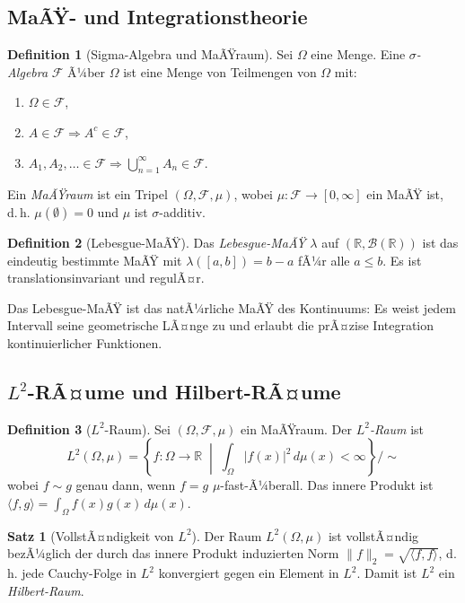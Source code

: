 ﻿\documentclass[a4paper,12pt]{article}
\theoremstyle{definition}
\newtheorem{definition}{Definition}
\newtheorem{satz}{Satz}
\begin{document}
\subsection{MaÃŸ- und Integrationstheorie}

\begin{definition}[Sigma-Algebra und MaÃŸraum]
Sei $\Omega$ eine Menge.  Eine \emph{$\sigma$-Algebra} $\mathcal{F}$ Ã¼ber $\Omega$ ist eine
Menge von Teilmengen von $\Omega$ mit:
\begin{enumerate}
    \item $\Omega \in \mathcal{F}$,
    \item $A \in \mathcal{F} \Rightarrow A^c \in \mathcal{F}$,
    \item $A_1, A_2, \ldots \in \mathcal{F} \Rightarrow \bigcup_{n=1}^\infty A_n \in \mathcal{F}$.
\end{enumerate}
Ein \emph{MaÃŸraum} ist ein Tripel $(\Omega, \mathcal{F}, \mu)$, wobei
$\mu: \mathcal{F} \to [0,\infty]$ ein MaÃŸ ist, d.\,h. $\mu(\emptyset)=0$ und
$\mu$ ist $\sigma$-additiv.
\end{definition}

\begin{definition}[Lebesgue-MaÃŸ]
Das \emph{Lebesgue-MaÃŸ} $\lambda$ auf $(\mathbb{R}, \mathcal{B}(\mathbb{R}))$ ist
das eindeutig bestimmte MaÃŸ mit $\lambda([a,b]) = b-a$ fÃ¼r alle $a \leq b$.
Es ist translationsinvariant und regulÃ¤r.
\end{definition}

Das Lebesgue-MaÃŸ ist das natÃ¼rliche MaÃŸ des Kontinuums: Es weist jedem Intervall
seine geometrische LÃ¤nge zu und erlaubt die prÃ¤zise Integration kontinuierlicher Funktionen.

\subsection{$L^2$-RÃ¤ume und Hilbert-RÃ¤ume}

\begin{definition}[$L^2$-Raum]
\label{def:l2}
Sei $(\Omega, \mathcal{F}, \mu)$ ein MaÃŸraum.  Der \emph{$L^2$-Raum} ist
\[
L^2(\Omega, \mu) = \left\{ f: \Omega \to \mathbb{R} \;\middle|\;
\int_\Omega |f(x)|^2 \, d\mu(x) < \infty \right\} / \!\!\sim
\]
wobei $f \sim g$ genau dann, wenn $f=g$ $\mu$-fast-Ã¼berall.
Das innere Produkt ist $\langle f, g \rangle = \int_\Omega f(x) g(x) \, d\mu(x)$.
\end{definition}

\begin{satz}[VollstÃ¤ndigkeit von $L^2$]
\label{satz:vollstaendigkeit}
Der Raum $L^2(\Omega, \mu)$ ist vollstÃ¤ndig bezÃ¼glich der durch das innere Produkt
induzierten Norm $\|f\|_2 = \sqrt{\langle f,f\rangle}$, d.\,h. jede Cauchy-Folge
in $L^2$ konvergiert gegen ein Element in $L^2$.  Damit ist $L^2$ ein
\emph{Hilbert-Raum}.
\end{satz}
\end{document}
